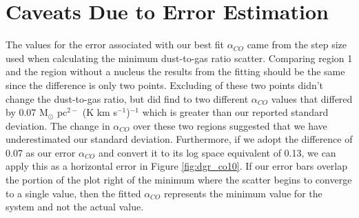 \section{Caveats Due to Error Estimation}

The values for the error associated with our best fit $\alpha_{CO}$ came from the step size used when calculating the minimum dust-to-gas ratio scatter.  Comparing region 1 and the region without a nucleus the results from the fitting should be the same since the difference is only two points.  Excluding of these two points didn't change the dust-to-gas ratio, but did find to two different $\alpha_{CO}$ values that differed by 0.07 M$_\odot$ pc$^{2-}$ (K km s$^{-1}$)$^{-1}$ which is greater than our reported standard deviation.  The change in $\alpha_{CO}$ over these two regions suggested that we have underestimated our standard deviation.  Furthermore, if we adopt the difference of 0.07 as our error $\alpha_{CO}$ and convert it to its log space equivalent of 0.13, we can apply this as a horizontal error in Figure \ref{fig:dgr_co10}.  If our error bars overlap the portion of the plot right of the minimum where the scatter begins to converge to a single value, then the fitted $\alpha_{CO}$ represents the minimum value for the system and not the actual value.